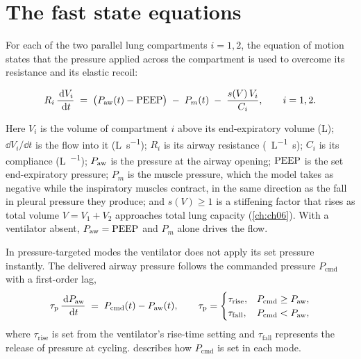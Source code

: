\section{The fast state equations}
\label{sec:num-fast}
For each of the two parallel lung compartments $i = 1, 2$, the equation of motion~\citep{otis1956,bates2009} states that the pressure applied across the compartment is used to overcome its resistance and its elastic recoil:
\begin{keyequation}
\begin{equation}
R_i\,\frac{\,\mathrm{d} V_i}{\,\mathrm{d} t} \;=\; \bigl(P_{\mathrm{aw}}(t) - \mathrm{PEEP}\bigr) \;-\; P_m(t) \;-\; \frac{s(V)\,V_i}{C_i},
\qquad i = 1,2.
\label{eq:num-eom}
\end{equation}
\end{keyequation}
Here $V_i$ is the volume of compartment $i$ above its end-expiratory volume (\si{\liter}); $\dd V_i/\dd t$ is the flow into it (\si{\liter\per\second}); $R_i$ is its airway resistance (\si{\cmH\per\liter\second}); $C_i$ is its compliance (\si{\liter\per\cmH}); $P_{\mathrm{aw}}$ is the pressure at the airway opening; $\mathrm{PEEP}$ is the set end-expiratory pressure; $P_m$ is the muscle pressure, which the model takes as negative while the inspiratory muscles contract, in the same direction as the fall in pleural pressure they produce; and $s(V)\ge 1$ is a stiffening factor that rises as total volume $V = V_1+V_2$ approaches total lung capacity (\cref{ch:ch06}). With a ventilator absent, $P_{\mathrm{aw}} = \mathrm{PEEP}$ and $P_m$ alone drives the flow.

In pressure-targeted modes the ventilator does not apply its set pressure instantly. The delivered airway pressure follows the commanded pressure $P_{\mathrm{cmd}}$ with a first-order lag,
\begin{equation}
\tau_{\mathrm{p}}\,\frac{\,\mathrm{d} P_{\mathrm{aw}}}{\,\mathrm{d} t} \;=\; P_{\mathrm{cmd}}(t) - P_{\mathrm{aw}}(t),
\qquad
\tau_{\mathrm{p}} = \begin{cases} \tau_{\mathrm{rise}}, & P_{\mathrm{cmd}} \ge P_{\mathrm{aw}},\\ \tau_{\mathrm{fall}}, & P_{\mathrm{cmd}} < P_{\mathrm{aw}},\end{cases}
\label{eq:num-paw}
\end{equation}
where $\tau_{\mathrm{rise}}$ is set from the ventilator's rise-time setting and $\tau_{\mathrm{fall}}$ represents the release of pressure at cycling.  describes how $P_{\mathrm{cmd}}$ is set in each mode.

